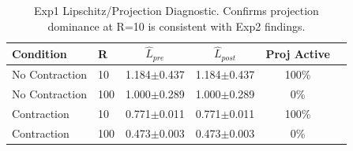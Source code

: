 \begin{table}[h]
\centering
\caption{Exp1 Lipschitz/Projection Diagnostic. Confirms projection dominance at R=10 is consistent with Exp2 findings.}
\label{tab:exp1_lipschitz_diag}
\begin{tabular}{llcccc}
\toprule
Condition & R & $\hat{L}_{pre}$ & $\hat{L}_{post}$ & Proj Active \\
\midrule
  No Contraction & 10 & 1.184$\pm$0.437 & 1.184$\pm$0.437 & 100\% \\
  No Contraction & 100 & 1.000$\pm$0.289 & 1.000$\pm$0.289 & 0\% \\
  Contraction & 10 & 0.771$\pm$0.011 & 0.771$\pm$0.011 & 100\% \\
  Contraction & 100 & 0.473$\pm$0.003 & 0.473$\pm$0.003 & 0\% \\
\bottomrule
\end{tabular}
\end{table}
